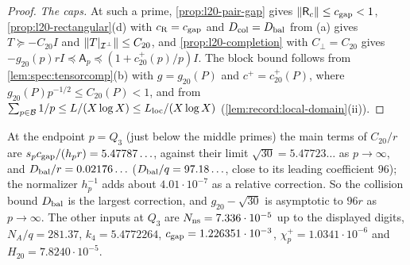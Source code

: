 \begin{proof}
\emph{The caps.} At such a prime, \cref{prop:l20-pair-gap} gives
$\left\|\mathsf R_c\right\|\le c_{\rm gap}<1$, \cref{prop:l20-rectangular}(d) with
$c_{\rm R}=c_{\rm gap}$ and $D_{\rm col}=D_{\rm bal}$ from (a) gives
$T\succeq-C_{20}I$ and $\left\|T|_{\mathcal I^\perp}\right\|\le C_{20}$, and
\cref{prop:l20-completion} with $C_\perp=C_{20}$ gives
$-g_{20}(p)rI\preceq\mathsf A_p\preceq(1+c^+_{20}(p)/p)I$. The block bound follows
from \cref{lem:spec:tensorcomp}(b) with $g=g_{20}(P)$ and $c^+=c^+_{20}(P)$,
where $g_{20}(P)p^{-1/2}\le C_{20}(P)<1$, and from
$\sum_{p\in\mathcal B}1/p\le L/(X\log X)\le L_{\rm loc}/(X\log X)$
(\cref{lem:record:local-domain}(ii)).
\end{proof}

At the endpoint $p=Q_3$ (just below the middle primes) the main terms of $C_{20}/r$
are $s_pc_{\rm gap}/(h_pr)=5.47787\ldots$, against their limit
$\sqrt{30}=5.47723\ldots$ as $p\to\infty$, and
$D_{\rm bal}/r=0.02176\ldots$ ($D_{\rm bal}/q=97.18\ldots$,
close to its leading coefficient $96$); the normalizer
$h_p^{-1}$ adds about $4.01\cdot10^{-7}$ as a relative correction. So the
collision bound $D_{\rm bal}$ is the largest correction, and
$g_{20}-\sqrt{30}$ is asymptotic to $96r$ as $p\to\infty$. The
other inputs at $Q_3$ are $N_{\rm ns}=7.336\cdot10^{-5}$ up to
the displayed digits,
$N_A/q=281.37$, $k_4=5.4772264$, $c_{\rm gap}=1.226351\cdot10^{-3}$,
$\chi^+_p=1.0341\cdot10^{-6}$ and $H_{20}=7.8240\cdot10^{-5}$.

